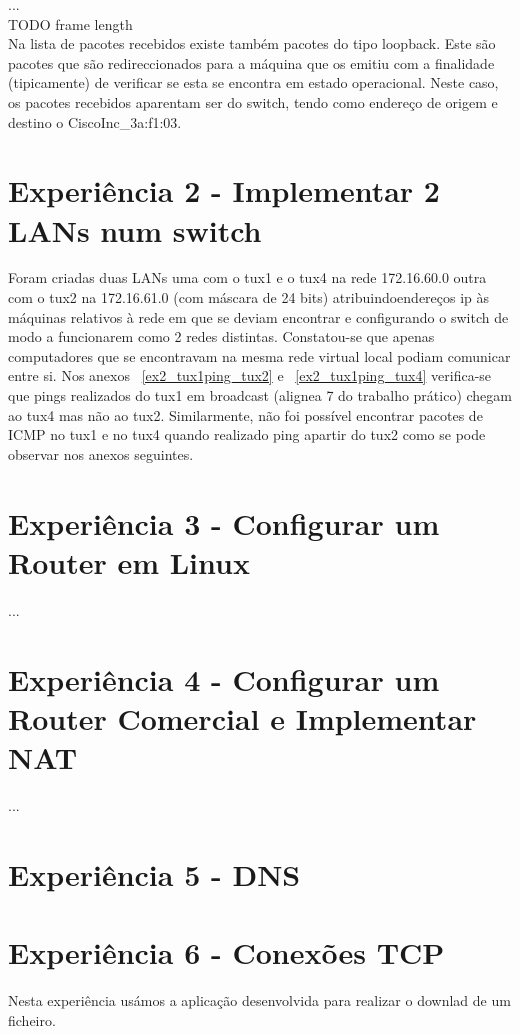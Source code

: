 \documentclass[11pt,a4paper,reqno]{report}
\numberwithin{equation}{section}
\begin{document}
...\\ TODO frame length \\

Na lista de pacotes recebidos existe também pacotes do tipo loopback. Este são pacotes que são redireccionados para a máquina que os emitiu com a finalidade (tipicamente) de verificar se esta se encontra em estado operacional. Neste caso, os pacotes recebidos aparentam ser do switch, tendo como endereço de origem e destino o CiscoInc\_3a:f1:03.

\section{Experiência 2 - Implementar 2 LANs num switch}

Foram criadas duas LANs uma com o tux1 e o tux4 na rede 172.16.60.0 outra com o tux2 na 172.16.61.0 (com máscara de 24 bits) atribuindoendereços  ip às máquinas relativos à rede em que se deviam encontrar e configurando o switch de modo a funcionarem como 2 redes distintas. Constatou-se que apenas  computadores que se encontravam na mesma rede virtual local podiam comunicar entre si. Nos anexos ~\ref{ex2_tux1ping_tux2} e ~\ref{ex2_tux1ping_tux4} verifica-se que pings realizados do tux1 em broadcast (alignea 7 do trabalho prático) chegam ao tux4 mas não ao tux2. Similarmente, não foi possível encontrar pacotes de ICMP no tux1 e no tux4 quando realizado ping apartir do tux2 como se pode observar nos anexos seguintes.


\section{Experiência 3 - Configurar um Router em Linux}
...
\section{Experiência 4 - Configurar um Router Comercial e Implementar NAT}
...
\section{Experiência 5 - DNS}

\section{Experiência 6 - Conexões TCP}

Nesta experiência usámos a aplicação desenvolvida para realizar o downlad de um ficheiro.
\end{document}
